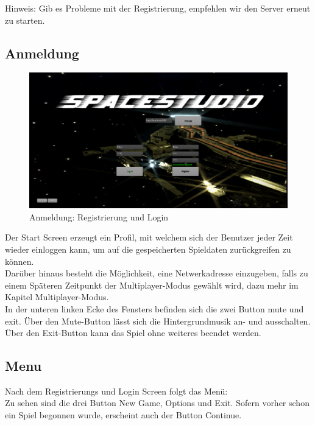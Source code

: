 \documentclass[fontsize=12pt,paper=a4,twoside]{scrartcl}
\begin{document}
Hinweis: Gib es Probleme mit der Registrierung, empfehlen wir den Server erneut zu starten.

\subsection{Anmeldung}
\begin{figure}[htp]
\centering
	\includegraphics[width=1.00\linewidth]{pics/StartScreen01.png}
	\caption{Anmeldung: Registrierung und Login}
\end{figure}

Der Start Screen erzeugt ein Profil, mit welchem sich der Benutzer jeder Zeit wieder einloggen kann, um auf die gespeicherten Spieldaten zurückgreifen zu können. \\
Darüber hinaus besteht die Möglichkeit, eine Netwerkadresse einzugeben, falls zu einem Späteren Zeitpunkt der Multiplayer-Modus gewählt wird, dazu mehr im Kapitel Multiplayer-Modus.\\
In der unteren linken Ecke des Fensters befinden sich die zwei Button mute und exit. Über den Mute-Button lässt sich die Hintergrundmusik an- und ausschalten. 
Über den Exit-Button kann das Spiel ohne weiteres beendet werden.

\newpage

\subsection{Menu}

Nach dem Registrierungs und Login Screen folgt das Menü:\\
Zu sehen sind die drei Button New Game, Options und Exit. Sofern vorher schon ein Spiel begonnen wurde, erscheint auch der Button Continue.\\
\end{document}
